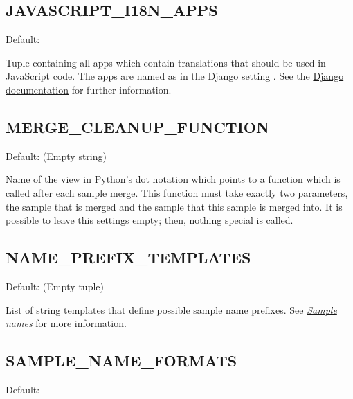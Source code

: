 \documentclass[a4paper,11pt,english]{sphinxmanual}
\begin{document}
\subsection{JAVASCRIPT\_I18N\_APPS}
\label{programming/settings:index-7}\label{programming/settings:javascript-i18n-apps}
Default: 

Tuple containing all apps which contain translations that should be used in
JavaScript code.  The apps are named as in the Django setting
.  See the \href{https://docs.djangoproject.com/en/dev/topics/i18n/translation/\#internationalization-in-javascript-code}{Django documentation}
for further information.


\subsection{MERGE\_CLEANUP\_FUNCTION}
\label{programming/settings:index-8}\label{programming/settings:merge-cleanup-function}
Default:  (Empty string)

Name of the view in Python's dot notation which points to a function which is
called after each sample merge.  This function must take exactly two
parameters, the sample that is merged and the sample that this sample is merged
into.  It is possible to leave this settings empty; then, nothing special is
called.


\subsection{NAME\_PREFIX\_TEMPLATES}
\label{programming/settings:name-prefix-templates}\label{programming/settings:index-9}
Default: \code{()} (Empty tuple)

List of string templates that define possible sample name prefixes.  See
{\hyperref[programming/sample_names::doc]{\emph{Sample names}}} for more information.


\subsection{SAMPLE\_NAME\_FORMATS}
\label{programming/settings:sample-name-formats}\label{programming/settings:index-10}
Default:
\end{document}
